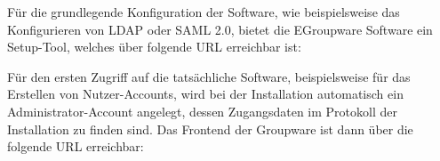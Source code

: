 Für die grundlegende Konfiguration der Software, wie beispielsweise das Konfigurieren von LDAP oder SAML 2.0, bietet die EGroupware Software ein Setup-Tool, welches über folgende URL erreichbar ist:


Für den ersten Zugriff auf die tatsächliche Software, beispielsweise für das Erstellen von Nutzer-Accounts, wird bei der Installation automatisch ein Administrator-Account angelegt, dessen Zugangsdaten im Protokoll der Installation zu finden sind.
Das Frontend der Groupware ist dann über die folgende URL erreichbar:


